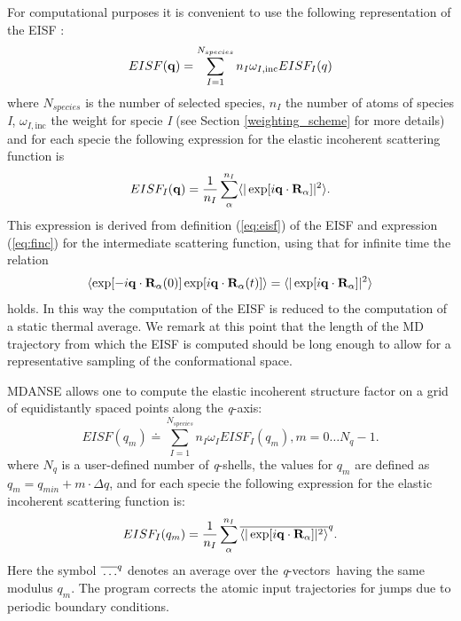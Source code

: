 \documentclass[a4paper,11pt]{article}
\newcommand{\qval}{\textit{q}}
\newcommand{\qvects}{\textit{q}-vectors}
\newcommand{\qshells}{\textit{q}-shells}
\begin{document}
For computational purposes it is convenient to use the following representation of the \gls{EISF} \cite{Smith:1992}:
\begin{equation}
\label{eq:eisf_compute}
EISF({\bf q}) = \sum^{N_{species}}_{I = 1} n_I \omega_{I,\mathrm{inc}} EISF_I(q)
\end{equation}
where $N_{species}$ is the number of selected species, $n_I$ the number of atoms of species \textit{I}, $\omega_{I,\mathrm{inc}}$ the weight for 
specie \textit{I} (see Section \ref{weighting_scheme} for more details) and for each specie the following expression for the elastic 
incoherent scattering function is
\begin{equation}
\label{eisf_rho}
EISF_I({\bf q}) = \frac{1}{n_I}\sum^{n_I}_{\alpha}  \langle|\exp[i{\bf q}\cdot{\bf R}_\alpha]|^2\rangle.
\end{equation}
This expression is derived from definition (\ref{eq:eisf}) of the \gls{EISF} and expression (\ref{eq:finc}) for the intermediate 
scattering function, using that for infinite time the relation
\begin{equation}
\langle\exp[-i{\bf q}\cdot{\bf R}_\alpha(0)]
\exp[i{\bf q}\cdot{\bf R}_\alpha(t)]\rangle =
\langle|\exp[i{\bf q}\cdot{\bf R}_\alpha]|^2 \rangle 
\end{equation}
holds. In this way the computation of the \gls{EISF} is reduced to the computation of a static thermal average. We remark at this 
point that the length of the \gls{MD} trajectory from which the \gls{EISF} is computed should be long enough to allow for a representative 
sampling of the conformational space.

\gls{MDANSE} allows one to compute the elastic incoherent structure factor on a grid of equidistantly spaced points along the
\qval-axis:
\begin{equation}
EISF(q_m) \doteq \sum^{N_{species}}_{I = 1} n_I \omega_I EISF_I(q_m), m = 0\ldots N_q - 1.
\end{equation}
where $N_q$ is a user-defined number of \qshells, the values for $q_m$ are defined as $q_m = q_{min} + m\cdot\Delta q$, 
and for each specie the following expression for the elastic incoherent scattering function is:
\begin{equation}
\label{eq:eisf_q_average}
EISF_I(q_m) = \frac{1}{n_I}\sum^{n_I}_{\alpha} \overline{ \langle|\exp[i{\bf q}\cdot{\bf R}_\alpha]|^2\rangle}^q.
\end{equation}
Here the symbol $\overline{\rule{0pt}{5pt}\ldots}^{q}$ denotes an average over the \qvects\ having the same modulus
$q_m$. The program corrects the atomic input trajectories for jumps due to periodic boundary conditions. 
\end{document}
